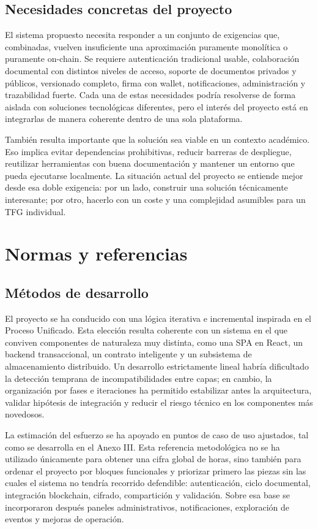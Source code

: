 \documentclass[11pt, a4paper]{article}
\begin{document}
\subsection{Necesidades concretas del proyecto}

El sistema propuesto necesita responder a un conjunto de exigencias que, combinadas, vuelven insuficiente una aproximación puramente monolítica o puramente on-chain. Se requiere autenticación tradicional usable, colaboración documental con distintos niveles de acceso, soporte de documentos privados y públicos, versionado completo, firma con wallet, notificaciones, administración y trazabilidad fuerte. Cada una de estas necesidades podría resolverse de forma aislada con soluciones tecnológicas diferentes, pero el interés del proyecto está en integrarlas de manera coherente dentro de una sola plataforma.

También resulta importante que la solución sea viable en un contexto académico. Eso implica evitar dependencias prohibitivas, reducir barreras de despliegue, reutilizar herramientas con buena documentación y mantener un entorno que pueda ejecutarse localmente. La situación actual del proyecto se entiende mejor desde esa doble exigencia: por un lado, construir una solución técnicamente interesante; por otro, hacerlo con un coste y una complejidad asumibles para un TFG individual.

\section{Normas y referencias}

\subsection{Métodos de desarrollo}

El proyecto se ha conducido con una lógica iterativa e incremental inspirada en el Proceso Unificado. Esta elección resulta coherente con un sistema en el que conviven componentes de naturaleza muy distinta, como una SPA en React, un backend transaccional, un contrato inteligente y un subsistema de almacenamiento distribuido. Un desarrollo estrictamente lineal habría dificultado la detección temprana de incompatibilidades entre capas; en cambio, la organización por fases e iteraciones ha permitido estabilizar antes la arquitectura, validar hipótesis de integración y reducir el riesgo técnico en los componentes más novedosos.

La estimación del esfuerzo se ha apoyado en puntos de caso de uso ajustados, tal como se desarrolla en el Anexo III. Esta referencia metodológica no se ha utilizado únicamente para obtener una cifra global de horas, sino también para ordenar el proyecto por bloques funcionales y priorizar primero las piezas sin las cuales el sistema no tendría recorrido defendible: autenticación, ciclo documental, integración blockchain, cifrado, compartición y validación. Sobre esa base se incorporaron después paneles administrativos, notificaciones, exploración de eventos y mejoras de operación.
\end{document}

